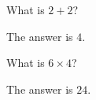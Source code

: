 \documentclass[12pt,letterpaper]{hmcpset}
\begin{document}

\begin{problem}[Rudin 3.1]
What is $2+2$?
\end{problem}

\begin{solution}
The answer is $4$.
\end{solution}


\begin{problem}[Rudin 3.2]
What is $6 \times 4$?    
\end{problem}

\begin{solution}
The answer is $24$.
\end{solution}
\end{document}
